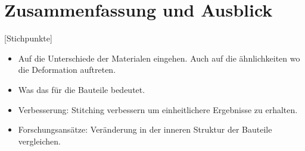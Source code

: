 
\chapter{Zusammenfassung und Ausblick}

[Stichpunkte]

\begin{itemize}
    \item Auf die Unterschiede der Materialen eingehen. Auch auf die ähnlichkeiten 
    wo die Deformation auftreten.
    \item Was das für die Bauteile bedeutet.
    \item Verbesserung: Stitching verbessern um einheitlichere Ergebnisse zu erhalten.
    \item Forschungsansätze: Veränderung in der inneren Struktur der Bauteile 
    vergleichen.
\end{itemize}
